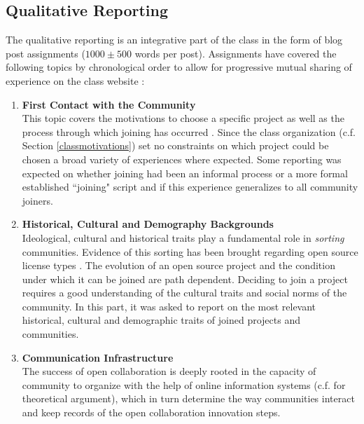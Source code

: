 \subsection{Qualitative Reporting}

The qualitative reporting is an integrative part of the class in the form of blog post assignments ($1000\pm500$ words per post). Assignments have covered the following topics by chronological order to allow for progressive mutual sharing of experience on the class website \cite{classweb2013}:

\begin{enumerate}
  \item {\bf First Contact with the Community} \\ 
This topic covers the motivations to choose a specific project as well as the process through which joining has occurred \cite{lakhani2005htu,robert2006,vonKrogh2012,}. Since the class organization (c.f. Section \ref{classmotivations}) set no constraints on which project could be chosen a broad variety of experiences where expected. Some reporting was expected on whether joining had been an informal process or a more formal established ``joining" script \cite{vonkrogh2003} and if this experience generalizes to all community joiners.\\

  \item {\bf Historical, Cultural and Demography Backgrounds} \\
Ideological, cultural and historical traits play a fundamental role in {\it sorting} communities. Evidence of this sorting has been brought regarding open source license types \cite{belenzon2009}. The evolution of an open source project and the condition under which it can be joined are path dependent. Deciding to join a project requires a good understanding of the cultural traits and social norms of the community. In this part, it was asked to report on the most relevant historical, cultural and demographic traits of joined projects and communities. \\


 \item{\bf Communication Infrastructure}\\
The success of open collaboration is deeply rooted in the capacity of community to organize with the help of online information systems (c.f. \cite{benkler2002} for theoretical argument), which in turn determine the way communities interact and keep records of the open collaboration innovation steps. \\


\end{enumerate}
